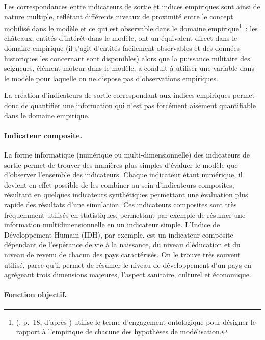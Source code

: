Les correspondances entre indicateurs de sortie et indices empiriques sont ainsi de nature multiple, reflétant différents niveaux de proximité entre le concept mobilisé dans le modèle et ce qui est observable dans le domaine empirique\footnote{
		\citeauthor{varenne2013modeles} (\citeyear{varenne2013modeles}, p.~18, d'après \cite[142]{rey-coyrehourcq_plateforme_2015}) utilise le terme d'\og{}engagement ontologique\fg{} pour désigner le rapport à l'empirique de chacune des hypothèses de modélisation.
} :
	les châteaux, entités d'intérêt dans le modèle, ont un équivalent direct dans le domaine empirique (il s'agit d'entités facilement observables et des données historiques les concernant sont disponibles) alors que la puissance militaire des seigneurs, élément moteur dans le modèle, a conduit à utiliser une variable dans le modèle pour laquelle on ne dispose pas d'observations empiriques.

La création d'indicateurs de sortie correspondant aux indices empiriques permet donc de quantifier une information qui n'est pas forcément aisément quantifiable dans le domaine empirique.

\paragraph{Indicateur composite.}

La forme \og informatique\fg{} (numérique ou multi-dimensionnelle) des indicateurs de sortie permet de trouver des manières plus simples d'évaluer le modèle que d'observer l'ensemble des indicateurs.
Chaque indicateur étant numérique, il devient en effet possible de les combiner au sein d'indicateurs composites, résultant en quelques indicateurs synthétiques permettant une évaluation plus rapide des résultats d'une simulation.
Ces indicateurs composites sont très fréquemment utilisés en statistiques, permettant par exemple de résumer une information multidimensionnelle en un indicateur simple.
L'Indice de Développement Humain (IDH), par exemple, est un indicateur composite dépendant de l'espérance de vie à la naissance, du niveau d'éducation et du niveau de revenu de chacun des pays caractérisés.
On le trouve très souvent utilisé, parce qu'il permet de résumer le niveau de développement d'un pays en agrégeant trois dimensions majeures, l'aspect sanitaire, culturel et économique.

\paragraph{Fonction objectif.}


